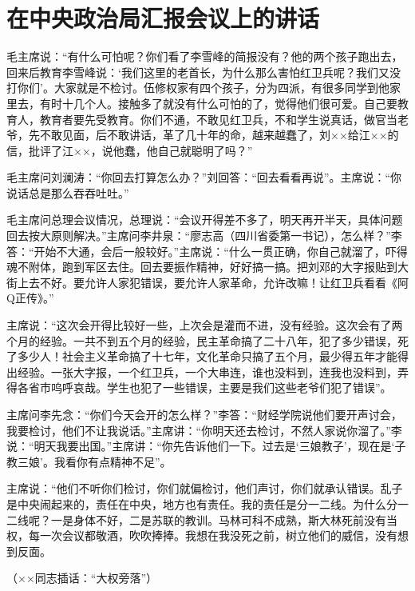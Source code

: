 \section[在中央政治局汇报会议上的讲话（一九六六年十月二十四日）]{在中央政治局汇报会议上的讲话}


毛主席说：“有什么可怕呢？你们看了李雪峰的简报没有？他的两个孩子跑出去，回来后教育李雪峰说：‘我们这里的老首长，为什么那么害怕红卫兵呢？我们又没打你们’。大家就是不检讨。伍修权家有四个孩子，分为四派，有很多同学到他家里去，有时十几个人。接触多了就没有什么可怕的了，觉得他们很可爱。自己要教育人，教育者要先受教育。你们不通，不敢见红卫兵，不和学生说真话，做官当老爷，先不敢见面，后不敢讲话，革了几十年的命，越来越蠢了，刘××给江××的信，批评了江××，说他蠢，他自己就聪明了吗？”

毛主席问刘澜涛：“你回去打算怎么办？”刘回答：“回去看看再说”。主席说：“你说话总是那么吞吞吐吐。”

毛主席问总理会议情况，总理说：“会议开得差不多了，明天再开半天，具体问题回去按大原则解决。”主席问李井泉：“廖志高（四川省委第一书记），怎么样？”李答：“开始不大通，会后一般较好。”主席说：“什么一贯正确，你自己就溜了，吓得魂不附体，跑到军区去住。回去要振作精神，好好搞一搞。把刘邓的大字报贴到大街上去不好。要允许人家犯错误，要允许人家革命，允许改嘛！让红卫兵看看《阿Q正传》。”

主席说：“这次会开得比较好一些，上次会是灌而不进，没有经验。这次会有了两个月的经验。一共不到五个月的经验，民主革命搞了二十八年，犯了多少错误，死了多少人！社会主义革命搞了十七年，文化革命只搞了五个月，最少得五年才能得出经验。一张大字报，一个红卫兵，一个大串连，谁也没料到，连我也没料到，弄得各省市呜呼哀哉。学生也犯了一些错误，主要是我们这些老爷们犯了错误”。

主席问李先念：“你们今天会开的怎么样？”李答：“财经学院说他们要开声讨会，我要检讨，他们不让我说话。”主席讲：“你明天还去检讨，不然人家说你溜了。”李说：“明天我要出国。”主席讲：“你先告诉他们一下。过去是‘三娘教子’，现在是‘子教三娘’。我看你有点精神不足”。

主席说：“他们不听你们检讨，你们就偏检讨，他们声讨，你们就承认错误。乱子是中央闹起来的，责任在中央，地方也有责任。我的责任是分一二线。为什么分一二线呢？一是身体不好，二是苏联的教训。马林可科不成熟，斯大林死前没有当权，每一次会议都敬酒，吹吹捧捧。我想在我没死之前，树立他们的威信，没有想到反面。

（××同志插话：“大权旁落”）

